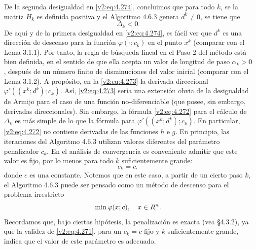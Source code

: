 De la segunda desigualdad en \eqref{v2:eq:4.274}, concluimos que para todo $k$, se la matriz $H_k$ es definida positiva y el Algoritmo 4.6.3 genera $d^k \neq 0$, se tiene que
\begin{equation}
    \Delta_k < 0.
    \label{v2:eq:4.279}
\end{equation}
De aquí y de la primera desigualdad en \eqref{v2:eq:4.274}, es fácil ver que $d^k$ es una dirección de descenso para la función $\varphi(\cdot; c_k)$ en el punto $x^k$ (comparar con el Lema 3.1.1). Por tanto, la regla de búsqueda lineal en el Paso 2 del método está bien definida, en el sentido de que ella acepta un valor de longitud de paso $\alpha_k > 0$, después de un número finito de disminuciones del valor inicial (comparar con el Lema 3.1.2). A propósito, en la \cref{v2:eq:4.273} la derivada direccional $\varphi'((x^k; d^k); c_k)$. Así, \eqref{v2:eq:4.273} sería una extensión obvia de la desigualdad de Armijo para el caso de una función no-diferenciable (que posee, sin embargo, derivadas direccionales). Sin embargo, la fórmula \eqref{v2:eq:4.272} para el cálculo de $\Delta_k$ es más simple de lo que la fórmula para $\varphi'((x^k; d^k); c_k)$. En particular, \eqref{v2:eq:4.272} no contiene derivadas de las funciones $h$ e $g$.
En principio, las iteraciones del Algoritmo 4.6.3 utilizan valores diferentes del parámetro penalizador $c_k$. En el análisis de convergencia es conveniente admitir que este valor es fijo, por lo menos para todo $k$ suficientemente grande:
\begin{equation}
    c_k = c,
    \label{v2:eq:4.280}
\end{equation}
donde $c$ es una constante. Notemos que en este caso, a partir de un cierto paso $k$, el Algoritmo 4.6.3 puede ser pensado como un método de descenso para el problema irrestricto
\[
    \min \varphi(x; c), \quad x \in R^n.
\]
Recordamos que, bajo ciertas hipótesis, la penalización es exacta (vea \S 4.3.2), ya que la validez de \eqref{v2:eq:4.271}, para un $c_k = c$ fijo y $k$ suficientemente grande, indica que el valor de este parámetro es adecuado.
